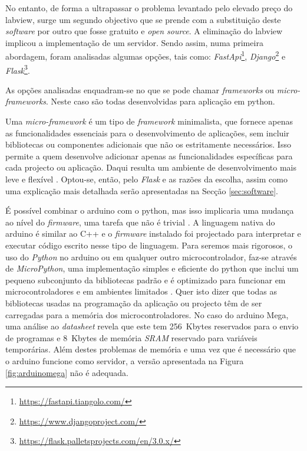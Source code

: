 No entanto, de forma a ultrapassar o problema levantado pelo elevado preço do \acrshort{labview}, surge um segundo objectivo que se prende com a substituição deste \textit{software} por outro que fosse gratuito e \textit{open source}. A eliminação do \acrshort{labview} implicou a implementação de um servidor. Sendo assim, numa primeira abordagem, foram analisadas algumas opções, tais como: \textit{FastApi}\footnote{\url{https://fastapi.tiangolo.com/}}, \textit{Django}\footnote{\url{https://www.djangoproject.com/}} e \textit{Flask}\footnote{\url{https://flask.palletsprojects.com/en/3.0.x/}}.

As opções analisadas enquadram-se no que se pode chamar \textit{frameworks} ou \textit{micro-frameworks}. Neste caso são todas desenvolvidas para aplicação em \gls{python}.

Uma \textit{micro-framework} é um tipo de \textit{framework} minimalista, que fornece apenas as funcionalidades essenciais para o desenvolvimento de aplicações, sem incluir bibliotecas ou componentes adicionais que não os estritamente necessários. Isso permite a quem desenvolve adicionar apenas as funcionalidades específicas para cada projecto ou aplicação. Daqui resulta um ambiente de desenvolvimento mais leve e flexível \cite{Flask}.
Optou-se, então, pelo \textit{Flask} e as razões da escolha, assim como uma explicação mais detalhada serão apresentadas na Secção \ref{sec:software}.

É possível combinar o \gls{arduino} com o \gls{python}, mas isso implicaria uma mudança ao nível do \textit{firmware}, uma tarefa que não é trivial \cite{Arduinopython}. A linguagem nativa do \gls{arduino} é similar ao C++ e o \textit{firmware} instalado foi projectado para interpretar e executar código escrito nesse tipo de linguagem. Para seremos mais rigorosos, o uso do \textit{Python} no \gls{arduino} ou em qualquer outro microcontrolador, faz-se através de \textit{MicroPython}, uma implementação simples e eficiente do \gls{python} que inclui um pequeno subconjunto da bibliotecas padrão e é optimizado para funcionar em microcontroladores e em ambientes limitados \cite{MicroPythondefinition}. Quer isto dizer que todas as bibliotecas usadas na programação da aplicação ou projecto têm de ser carregadas para a memória dos microcontroladores. No caso do \gls{arduino} Mega, uma análise ao \textit{datasheet} \cite{megadatasheet} revela que este tem \SI{256}{Kbytes} reservados para o envio de programas e \SI{8}{Kbytes} de memória \textit{SRAM} reservado para variáveis temporárias.
Além destes problemas de memória e uma vez que é necessário que o \gls{arduino} funcione como servidor, a versão apresentada na Figura \ref{fig:arduinomega} não é adequada.


